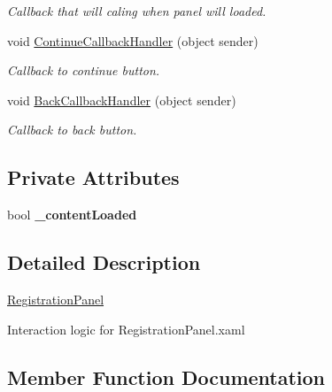 \begin{DoxyCompactItemize}
\begin{DoxyCompactList}\small\item\em Callback that will caling when panel will loaded. \end{DoxyCompactList}\item 
void \mbox{\hyperlink{class_wpf_handler_1_1_u_i_1_1_controls_1_1_logon_1_1_registration_panel_ae186646427b48ea8fbce2a8a208484c9}{Continue\+Callback\+Handler}} (object sender)
\begin{DoxyCompactList}\small\item\em Callback to continue button. \end{DoxyCompactList}\item 
void \mbox{\hyperlink{class_wpf_handler_1_1_u_i_1_1_controls_1_1_logon_1_1_registration_panel_adc95d35879b50f9b35504bb7610ce5d9}{Back\+Callback\+Handler}} (object sender)
\begin{DoxyCompactList}\small\item\em Callback to back button. \end{DoxyCompactList}\end{DoxyCompactItemize}
\subsection*{Private Attributes}
\begin{DoxyCompactItemize}
\item 
\mbox{\label{class_wpf_handler_1_1_u_i_1_1_controls_1_1_logon_1_1_registration_panel_a952c9b5d4435669a5f3446869e8e004c}} 
bool {\bfseries \+\_\+content\+Loaded}
\end{DoxyCompactItemize}


\subsection{Detailed Description}
\mbox{\hyperlink{class_wpf_handler_1_1_u_i_1_1_controls_1_1_logon_1_1_registration_panel}{Registration\+Panel}} 

Interaction logic for Registration\+Panel.\+xaml 

\subsection{Member Function Documentation}
\mbox{\label{class_wpf_handler_1_1_u_i_1_1_controls_1_1_logon_1_1_registration_panel_adc95d35879b50f9b35504bb7610ce5d9}} 
